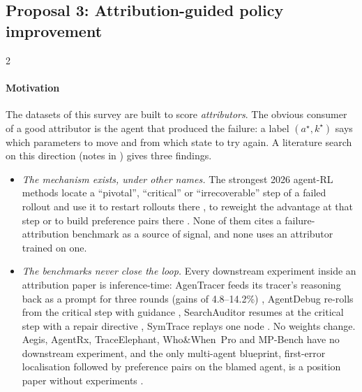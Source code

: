 \subsection{Proposal 3: Attribution-guided policy improvement}\label{sec:future:train}

\begin{multicols}{2}
\paragraph{Motivation} The datasets of this survey are built to score \emph{attributors}. The obvious consumer of a good attributor is the agent that produced the failure: a label $(a^\star,k^\star)$ says which parameters to move and from which state to try again. A literature search on this direction (notes in ) gives three findings.
\begin{itemize}[leftmargin=1.1em]
\item \emph{The mechanism exists, under other names.} The strongest 2026 agent-RL methods locate a ``pivotal'', ``critical'' or ``irrecoverable'' step of a failed rollout and use it to restart rollouts there \cite{tian2026mirl,guo2026pivoarl,shi2026r3l,liu2026sprout,liang2026elpo}, to reweight the advantage at that step \cite{zhu2026fault,huang2026etro,jung2026prover,agentevolver2025,zhu2026lvrl} or to build preference pairs there \cite{li2026cso,yuan2025agentr,steca2025,cuarecovery2026}. None of them cites a failure-attribution benchmark as a source of signal, and none uses an attributor trained on one.
\item \emph{The benchmarks never close the loop.} Every downstream experiment inside an attribution paper is inference-time: AgenTracer feeds its tracer's reasoning back as a prompt for three rounds (gains of 4.8--14.2\%) \cite{agentracer2026}, AgentDebug re-rolls from the critical step with guidance \cite{agentdebug2026}, SearchAuditor resumes at the critical step with a repair directive \cite{searchauditor2026}, SymTrace replays one node \cite{luan2026symtrace}. No weights change. Aegis, AgentRx, TraceElephant, Who\&When~Pro and MP-Bench have no downstream experiment, and the only multi-agent blueprint, first-error localisation followed by preference pairs on the blamed agent, is a position paper without experiments \cite{yang2025blame}.

\end{itemize}
\end{multicols}
